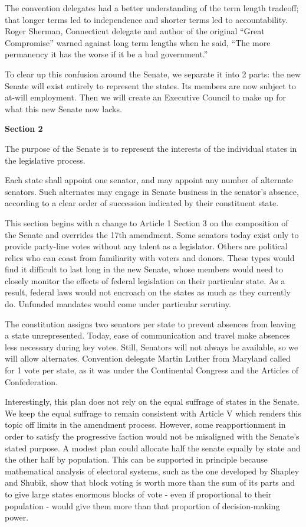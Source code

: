 \documentclass{article}
\newcommand{\quotes}[1]{``#1''}
\begin{document}
The convention delegates had a better understanding of the term length tradeoff; that longer terms led to independence and shorter terms led to accountability. Roger Sherman, Connecticut delegate and author of the original \quotes{Great Compromise} warned against long term lengths when he said, \quotes{The more permanency it has the worse if it be a bad government.}\cite{Madison}

To clear up this confusion around the Senate, we separate it into 2 parts: the new Senate will exist entirely to represent the states. Its members are now subject to at-will employment. Then we will create an Executive Council to make up for what this new Senate now lacks.

\begin{quoting}
\textbf{Section 2}

The purpose of the Senate is to represent the interests of the individual states in the legislative process.

Each state shall appoint one senator, and may appoint any number of alternate senators. Such alternates may engage in Senate business in the senator’s absence, according to a clear order of succession indicated by their constituent state.
\end{quoting}

This section begins with a change to Article 1 Section 3 on the composition of the Senate and overrides the 17th amendment. Some senators today exist only to provide party-line votes without any talent as a legislator. Others are political relics who can coast from familiarity with voters and donors. These types would find it difficult to last long in the new Senate, whose members would need to closely monitor the effects of federal legislation on their particular state. As a result, federal laws would not encroach on the states as much as they currently do. Unfunded mandates would come under particular scrutiny.

The constitution assigns two senators per state to prevent absences from leaving a state unrepresented. Today, ease of communication and travel make absences less necessary during key votes. Still, Senators will not always be available, so we will allow alternates. Convention delegate Martin Luther from Maryland called for 1 vote per state, as it was under the Continental Congress and the Articles of Confederation\cite{Senate}.

Interestingly, this plan does not rely on the equal suffrage of states in the Senate. We keep the equal suffrage to remain consistent with Article V which renders this topic off limits in the amendment process\cite{Amar}. However, some reapportionment in order to satisfy the progressive faction would not be misaligned with the Senate's stated purpose. A modest plan could allocate half the senate equally by state and the other half by population. This can be supported in principle because mathematical analysis of electoral systems, such as the one developed by Shapley and Shubik\cite{Shapley}, show that block voting is worth more than the sum of its parts\cite{Gross} and to give large states enormous blocks of vote - even if proportional to their population - would give them more than that proportion of decision-making power.
\end{document}
